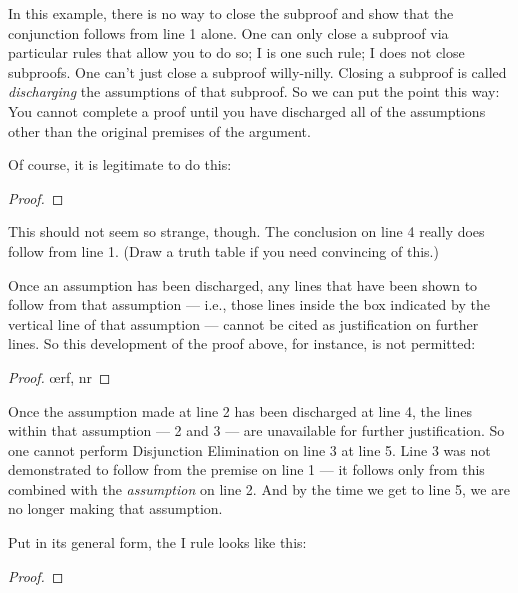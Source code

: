 In this example, there is no way to close the subproof and show that the conjunction follows from line 1 alone. One can only close a subproof via particular rules that allow you to do so; {\eif}I is one such rule; {\eand}I does not close subproofs. One can't just close a subproof willy-nilly. Closing a subproof is called \emph{discharging} the assumptions of that subproof. So we can put the point this way: You cannot complete a proof until you have discharged all of the assumptions other than the original premises of the argument.

Of course, it is legitimate to do this:

\begin{proof}
	\metaA{}
	\open
		\metaB{}
		 
	\close
	 
\end{proof}

This should not seem so strange, though. The conclusion on line 4 really does follow from line 1. (Draw a truth table if you need convincing of this.) 

Once an assumption has been discharged, any lines that have been shown to follow from that assumption --- i.e., those lines inside the box indicated by the vertical line of that assumption --- cannot be cited as justification on further lines. So this development of the proof above, for instance, is not permitted:

\begin{proof}
	\open
		\oe{rf, nr}
	\close
\end{proof}

Once the assumption made at line 2 has been discharged at line 4, the lines within that assumption --- 2 and 3 --- are unavailable for further justification. So one cannot perform Disjunction Elimination on line 3 at line 5. Line 3 was not demonstrated to follow from the premise on line 1 --- it follows only from this combined with the \emph{assumption} on line 2. And by the time we get to line 5, we are no longer making that assumption.

Put in its general form, the {\eif}I rule looks like this:

\begin{proof}
	\open
		\metaA{} 
		\metaB{}
	\close
\end{proof}

